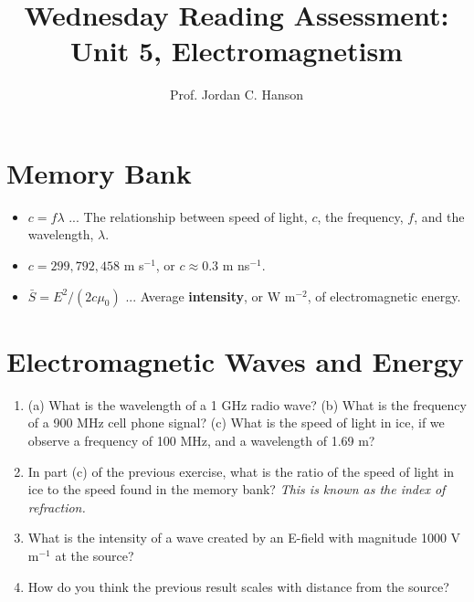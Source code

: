 \documentclass{article}
\begin{document}
\title{Wednesday Reading Assessment: Unit 5, Electromagnetism}
\author{Prof. Jordan C. Hanson}

\maketitle

\section{Memory Bank}

\begin{itemize}
\item $c = f\lambda$ ... The relationship between speed of light, $c$, the frequency, $f$, and the wavelength, $\lambda$.
\item $c = 299,792,458$ m s$^{-1}$, or $c \approx 0.3$ m ns$^{-1}$.
\item $\bar{S} = E^2/(2c\mu_0)$ ... Average \textbf{intensity}, or W m$^{-2}$, of electromagnetic energy.
\end{itemize}

\section{Electromagnetic Waves and Energy}

\begin{enumerate}
\item (a) What is the wavelength of a 1 GHz radio wave? (b) What is the frequency of a 900 MHz cell phone signal? (c) What is the speed of light in ice, if we observe a frequency of 100 MHz, and a wavelength of 1.69 m? \\ \vspace{2cm}
\item In part (c) of the previous exercise, what is the ratio of the speed of light in ice to the speed found in the memory bank? \textit{This is known as the index of refraction.}\\ \vspace{2cm}
\item What is the intensity of a wave created by an E-field with magnitude 1000 V m$^{-1}$ at the source? \\ \vspace{2cm}
\item How do you think the previous result scales with distance from the source?
\end{enumerate}
\end{document}
